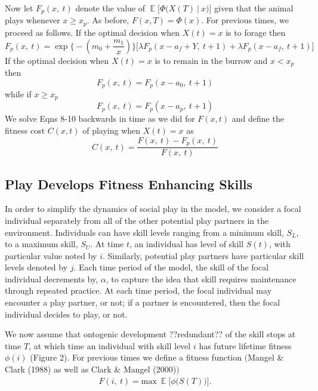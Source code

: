 \documentclass[12pt, letterpaper, fleqn]{article}
\DeclareMathOperator{\E}{\mathbb{E}}
\begin{document}
	
	Now let $F_p(x,~t)$ denote the value of  $\E\Big[\Phi\big(X(T)~|~x\big)\Big]$ given that the animal plays whenever $x \ge x_p$.  As before, $F(x,T)=\Phi(x)$.  
	For previous times, we proceed as follows.
	If the optimal decision when $X(t)=x$ is to forage then
	\begin{equation}
	F_p(x,~t)=\exp\bigg\{-\left(m_0+\frac{m_1}{x}\right)\bigg\}\big[\lambda F_p(x-a_f+Y,~t+1) + \lambda F_p(x-a_f,~t+1)\big]
	\end{equation}
	If the optimal decision when $X(t)=x$ is to remain in the burrow and $x < x_p$ then  
	\begin{equation}
	F_p(x,~t)=F_p(x-a_0,~t+1) 
	\end{equation}
	while if $x \ge x_p$
	\begin{equation}
	F_p(x,~t)=F_p(x-a_p,~t+1) 
	\end{equation}
	We solve Eqns 8-10 backwards in time as we did for $F(x,t)$ and define the fitness cost $C(x,t)$ of playing when $X(t)=x$ as
	\begin{equation}
	C(x,~t)=\frac{F(x,~t)-F_p(x,~t)}{F(x,~t)}
	\end{equation}
	
	\subsection*{Play Develops Fitness Enhancing Skills}
	
	In order to simplify the dynamics of social play in the model, we consider a focal individual separately from all of the other potential play partners in the environment.     
	Individuals can have skill levels ranging from a minimum skill, $S_L$, to a maximum skill, $S_U$. 
	At time $t$, an individual has level of skill  $S(t)$, with particular value noted by $i$.  
	Similarly, potential play partners have particular skill levels denoted by $j$. 
	Each time period of the model, the skill of the focal individual decrements by, $\alpha$, to capture the idea that skill requires maintenance through repeated practice.    
	At each time period, the focal individual may encounter a play partner, or not; if a partner is encountered, then the focal individual decides to play, or not. 
	
   
	We now assume that {\color{red}ontogenic development ??redundant??} of the skill stops at time $T$, at which time an individual with skill level $i$ has future lifetime fitness $\phi(i)$ (Figure 2).
	For previous times we define a fitness function $\big($Mangel \& Clark (1988) as well as Clark \& Mangel (2000)$\big)$
	\begin{eqnarray}
	F(i,~t)=\text{max}~\E\Big[\phi\big(S(T)\big)\Big].
	\label{first}
	\end{eqnarray}
	
\end{document}
